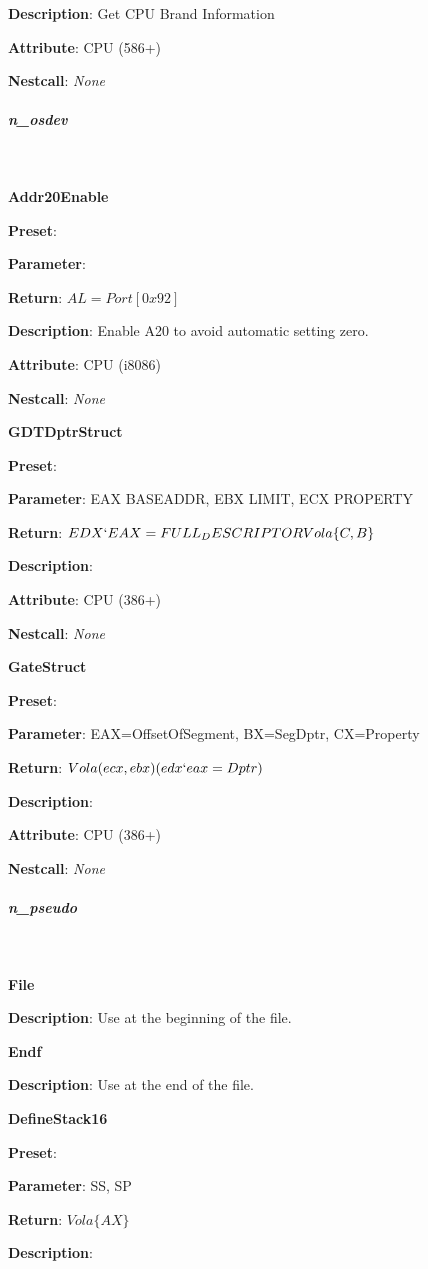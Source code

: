 \textbf{Description}: Get CPU Brand Information

\textbf{Attribute}: CPU (586+)

\textbf{Nestcall}: \textit{None}



\subparagraph{n\_osdev} \

\textbf{Addr20Enable}

\textbf{Preset}:

\textbf{Parameter}:

\textbf{Return}: $AL=Port[0x92]$

\textbf{Description}: Enable A20 to avoid automatic setting zero.

\textbf{Attribute}: CPU (i8086)

\textbf{Nestcall}: \textit{None}

\textbf{GDTDptrStruct}

\textbf{Preset}:

\textbf{Parameter}: EAX BASEADDR, EBX LIMIT, ECX PROPERTY

\textbf{Return}: $EDX`EAX=FULL_DESCRIPTOR Vola\{C,B\}$

\textbf{Description}:

\textbf{Attribute}: CPU (386+)

\textbf{Nestcall}: \textit{None}

\textbf{GateStruct}

\textbf{Preset}:

\textbf{Parameter}: EAX=OffsetOfSegment, BX=SegDptr, CX=Property

\textbf{Return}: $Vola(ecx,ebx) (edx`eax=Dptr)$

\textbf{Description}:

\textbf{Attribute}: CPU (386+)

\textbf{Nestcall}: \textit{None}



\subparagraph{n\_pseudo} \

\textbf{File}

\textbf{Description}: Use at the beginning of the file.

\textbf{Endf}

\textbf{Description}: Use at the end of the file.

\textbf{DefineStack16}

\textbf{Preset}:

\textbf{Parameter}: SS, SP

\textbf{Return}: $Vola\{AX\}$

\textbf{Description}:

